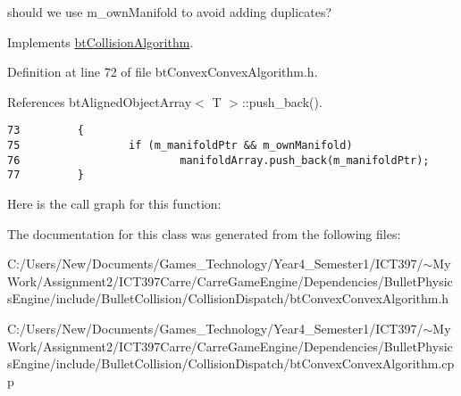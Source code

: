 should we use m\_\-ownManifold to avoid adding duplicates? 

Implements \hyperlink{classbt_collision_algorithm}{btCollisionAlgorithm}.

Definition at line 72 of file btConvexConvexAlgorithm.h.

References btAlignedObjectArray$<$ T $>$::push\_\-back().

\begin{Code}\begin{verbatim}73         {
75                 if (m_manifoldPtr && m_ownManifold)
76                         manifoldArray.push_back(m_manifoldPtr);
77         }
\end{verbatim}
\end{Code}




Here is the call graph for this function:

The documentation for this class was generated from the following files:\begin{CompactItemize}
\item 
C:/Users/New/Documents/Games\_\-Technology/Year4\_\-Semester1/ICT397/$\sim$My Work/Assignment2/ICT397Carre/CarreGameEngine/Dependencies/BulletPhysicsEngine/include/BulletCollision/CollisionDispatch/btConvexConvexAlgorithm.h\item 
C:/Users/New/Documents/Games\_\-Technology/Year4\_\-Semester1/ICT397/$\sim$My Work/Assignment2/ICT397Carre/CarreGameEngine/Dependencies/BulletPhysicsEngine/include/BulletCollision/CollisionDispatch/btConvexConvexAlgorithm.cpp\end{CompactItemize}
